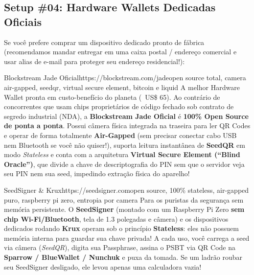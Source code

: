 \documentclass{pousadaguide}
\begin{document}
\clearpage
\subsection{Setup \#04: Hardware Wallets Dedicadas Oficiais}

Se você prefere comprar um dispositivo dedicado pronto de fábrica (recomendamos mandar entregar em uma caixa postal / endereço comercial e usar alias de e-mail para proteger seu endereço residencial!):

\begin{ferramenta}[goat,logo=jade,logo2=green]{Blockstream Jade Oficial}{https://blockstream.com/jade}{open source total, camera air-gapped, seedqr, virtual secure element, bitcoin e liquid}
A melhor Hardware Wallet pronta em custo-benefício do planeta (~US\$ 65). Ao contrário de concorrentes que usam chips proprietários de código fechado sob contrato de segredo industrial (NDA), a \textbf{Blockstream Jade Oficial} é \textbf{100\% Open Source de ponta a ponta}. Possui câmera física integrada na traseira para ler QR Codes e operar de forma totalmente \textbf{Air-Gapped} (sem precisar conectar cabo USB nem Bluetooth se você não quiser!), suporta leitura instantânea de \textbf{SeedQR} em modo \emph{Stateless} e conta com a arquitetura \textbf{Virtual Secure Element (“Blind Oracle”)}, que divide a chave de descriptografia do PIN sem que o servidor veja seu PIN nem sua seed, impedindo extração física do aparelho! 
\end{ferramenta}

\begin{ferramenta}[goat,logo=seedsigner,logo2=krux]{SeedSigner \& Krux}{https://seedsigner.com}{open source, 100\% stateless, air-gapped puro, raspberry pi zero, entropia por camera}
Para os puristas da segurança sem memória persistente. O \textbf{SeedSigner} (montado com um Raspberry Pi Zero \textbf{sem chip Wi-Fi/Bluetooth}, tela de 1.3 polegadas e câmera) e os dispositivos dedicados rodando \textbf{Krux} operam sob o princípio \textbf{Stateless}: eles não possuem memória interna para guardar sua chave privada! A cada uso, você carrega a seed via câmera (\emph{SeedQR}), digita sua Passphrase, assina o PSBT via QR Code na \textbf{Sparrow / BlueWallet / Nunchuk} e puxa da tomada. Se um ladrão roubar seu SeedSigner desligado, ele levou apenas uma calculadora vazia! 
\end{ferramenta}
\end{document}
